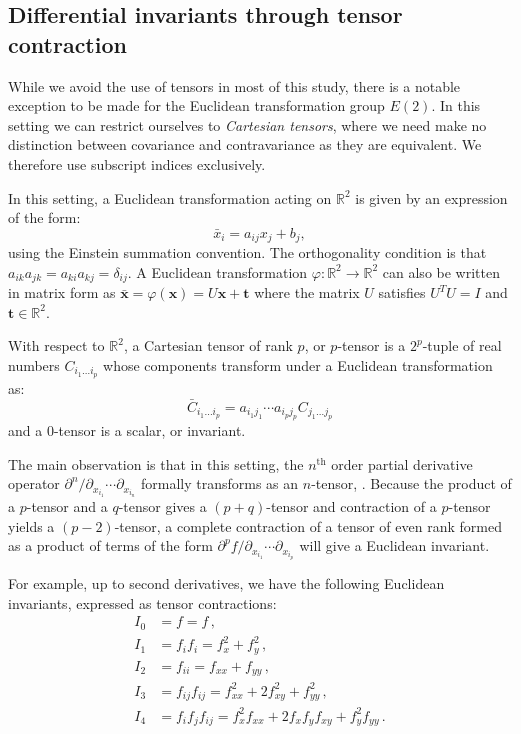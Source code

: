 \documentclass{artjlt}
\begin{document}
\subsection{Differential invariants through tensor contraction}
\label{sec:contraction}

While we avoid the use of tensors in most of this study, there is a notable
exception to be made for the Euclidean transformation group $E(2)$. In this
setting we can restrict ourselves to \emph{Cartesian tensors}, where we
need make no distinction between covariance and contravariance as they are
equivalent. We therefore use subscript indices exclusively.

In this setting, a Euclidean transformation acting on $\mathbb{R}^2$ is given
by an expression of the form:
\begin{equation*}
  \bar{x}_i = a_{ij}x_j + b_j,
\end{equation*}
using the Einstein summation convention. The orthogonality condition is
that $a_{ik}a_{jk} = a_{ki}a_{kj} = \delta_{ij}$. A Euclidean
transformation $\varphi \colon \mathbb{R}^2 \to \mathbb{R}^2$ can also be
written in matrix form as $\bar{\mathbf{x}} = \varphi(\mathbf{x}) =
U\mathbf{x} + \mathbf{t}$ where the matrix $U$ satisfies $U^TU = I$ and
$\mathbf{t} \in \mathbb{R}^2$.

With respect to $\mathbb{R}^2$, a Cartesian tensor of rank $p$, or $p$-tensor is a $2^p$-tuple of real numbers $C_{i_1\ldots i_p}$ whose components transform under a Euclidean transformation as:
\begin{equation*}
  \bar{C}_{i_1\ldots i_p} = a_{i_1j_1}\cdots a_{i_pj_p} C_{j_1\ldots j_p}
\end{equation*}
and a $0$-tensor is a scalar, or invariant. 

The main observation is that in this setting, the $n^\text{th}$ order
partial derivative operator $\partial^n / \partial_{x_{i_1}}\cdots
\partial_{x_{i_n}}$ formally transforms as an $n$-tensor, \citep{Florack1993}. Because the product of a $p$-tensor and a $q$-tensor gives a $(p+q)$-tensor and contraction of a $p$-tensor yields a $(p-2)$-tensor, a complete contraction of a tensor of even rank formed as a product of terms of the form $\partial^p f / \partial_{x_{i_1}} \cdots \partial_{x_{i_p}}$ will give a Euclidean invariant.

For example, up to second derivatives, we have the following Euclidean invariants, expressed as tensor contractions:
\begin{equation}
\label{eq:e2tensor}
\begin{aligned}
  I_0 &= f = f \,,\\
  I_1 &= f_if_i = f_x^2 + f_y^2  \,,\\
  I_2 &= f_{ii} = f_{xx} + f_{yy} \,,\\
  I_3 &= f_{ij} f_{ij} = f_{xx}^2 + 2f_{xy}^2 + f_{yy}^2 \,,\\
  I_4 &= f_i f_j f_{ij} = f_x^2 f_{xx} + 2f_x f_y f_{xy} + f_y^2 f_{yy}\,.
\end{aligned}
\end{equation}
\end{document}
